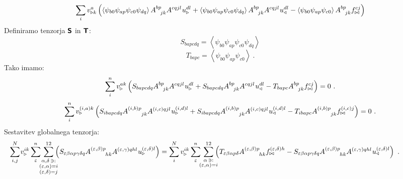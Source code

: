 \begin{equation*}
   \sum_i v^a_{\triangleright k} \left(
   \left\langle \psi_{b0} \psi_{ap} \psi_{c0} \psi_{dq} \right\rangle A^{bp}_{\mkern14mu jk} A^{cqjl} \mkern1mu u^{dl}_\triangleright
   +
   \left\langle \psi_{b0} \psi_{ap} \psi_{c0} \psi_{dq} \right\rangle A^{bp}_{\mkern14mu jk} A^{cqjl} \mkern1mu u^{dl}_\triangleleft
   -
   \left\langle \psi_{b0} \psi_{ap} \psi_{c0} \right\rangle A^{bp}_{\mkern14mu jk} f^{cj}_{\bowtie}
   \right)
\end{equation*}
Definiramo tenzorja $\bm{\mathsf{S}}$ in $\bm{\mathsf{T}}$:
\begin{equation}
   S_{bapcdq} = \left\langle \psi_{b0} \psi_{ap} \psi_{c0} \psi_{dq} \right\rangle
\end{equation}
\begin{equation}
   T_{bapc} = \left\langle \psi_{b0} \psi_{ap} \psi_{c0} \right\rangle \ .
\end{equation}
Tako imamo:
\begin{equation}
   \sum^n_i v^{ak}_{\triangleright} \left(
   S_{bapcdq} A^{bp}_{\mkern14mu jk} A^{cqjl} \mkern1mu u^{dl}_\triangleright
   +
   S_{bapcdq} A^{bp}_{\mkern14mu jk} A^{cqjl} \mkern1mu u^{dl}_\triangleleft
   -
   T_{bapc} A^{bp}_{\mkern14mu jk} f^{cj}_{\bowtie}
   \right) = 0 \ .
\end{equation}
\begin{equation*}
   \sum^n_i v^{(i,a)k}_{\triangleright} \left(
   S_{ibapcdq} A^{(i,b)p}_{\mkern42mu jk} A^{(i,c)qjl} \mkern1mu u^{(i,d)l}_\triangleright
   +
   S_{ibapcdq} A^{(i,b)p}_{\mkern42mu jk} A^{(i,c)qjl} \mkern1mu u^{(i,d)l}_\triangleleft
   -
   T_{ibapc} A^{(i,b)p}_{\mkern42mu jk} f^{(i,c)j}_{\bowtie}
   \right) = 0 \ .
\end{equation*}
Sestavitev globalnega tenzorja:
\begin{equation*}
   \mkern-80mu
   \sum^N_{i,j} \mkern-2mu v^{i k}_{\triangleright}
   \sum^n_\varepsilon
   \mkern-7mu
   \sum_{\substack{\alpha, \delta \, \ni: \\ (\varepsilon,\alpha) = i \\ (\varepsilon,\delta) = j}}^{12}
   \mkern-10mu
   \left(
   S_{\varepsilon \beta \alpha p \gamma \delta q}
   A^{(\varepsilon,\beta) p}_{\mkern46mu hk}
   A^{(\varepsilon,\gamma) qhl}
   \mkern1mu
   u^{(\varepsilon,\delta) l}_\triangleright \right)
   =
   \sum^N_i v^{i k}_{\triangleright}
   \sum^n_\varepsilon
   \mkern-7mu
   \sum_{\substack{\alpha \, \ni: \\ (\varepsilon,\alpha) = i}}^{12}
   \mkern-10mu
   \left(
   T_{\varepsilon \beta \alpha p \delta}
   A^{(\varepsilon,\beta) p}_{\mkern46mu hk}
   f^{(\varepsilon,\delta) h}_{\bowtie}
   -
   S_{\varepsilon \beta \alpha p \gamma \delta q}
   A^{(\varepsilon,\beta) p}_{\mkern46mu hk}
   A^{(\varepsilon,\gamma) qhl}
   \mkern1mu
   u^{(\varepsilon,\delta) l}_\triangleleft \right) \ .
\end{equation*}
